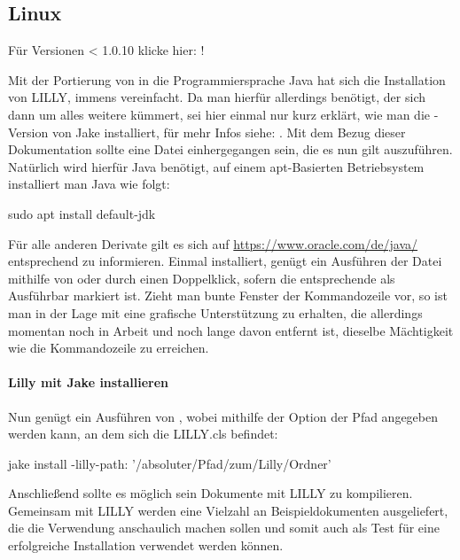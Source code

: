 \subsection{Linux}
\begin{center}
    Für Versionen < 1.0.10 klicke hier: !
\end{center}
Mit der Portierung von \Jake in die Programmiersprache Java hat sich die Installation von LILLY, immens vereinfacht.
Da man hierfür allerdings \Jake benötigt, der sich dann um alles weitere kümmert, sei hier einmal nur kurz erklärt, wie man die -Version von Jake installiert, für mehr Infos siehe: .\newline
Mit dem Bezug dieser Dokumentation sollte eine  Datei einhergegangen sein, die es nun gilt auszuführen. Natürlich wird hierfür Java benötigt, auf einem apt-Basierten Betriebsystem installiert man Java wie folgt:
\begin{bash}
sudo apt install default-jdk
\end{bash}
Für alle anderen Derivate gilt es sich auf \url{https://www.oracle.com/de/java/} entsprechend zu informieren.
Einmal installiert, genügt ein Ausführen der  Datei mithilfe von  oder durch
einen Doppelklick, sofern die entsprechende  als Ausführbar markiert ist. Zieht man bunte Fenster der Kommandozeile vor, so ist man in der Lage mit \newline{} eine grafische Unterstützung zu erhalten, die allerdings momentan noch in Arbeit und noch lange davon entfernt ist, dieselbe Mächtigkeit wie die Kommandozeile zu erreichen.
\paragraph{Lilly mit Jake installieren}
Nun genügt ein Ausführen von , wobei mithilfe der Option  der Pfad angegeben werden kann, an dem sich die LILLY.cls befindet:
\begin{bash}
jake install -lilly-path: '/absoluter/Pfad/zum/Lilly/Ordner'
\end{bash}
Anschließend sollte es möglich sein Dokumente mit LILLY zu kompilieren. Gemeinsam mit LILLY werden eine Vielzahl an Beispieldokumenten ausgeliefert, die die Verwendung anschaulich machen sollen und somit auch als Test für eine erfolgreiche Installation verwendet werden können.



